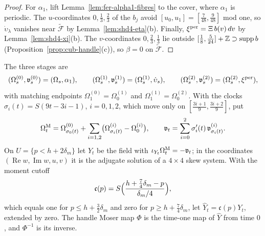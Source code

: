\begin{proof}
For $\alpha_1$, lift Lemma~\ref{lem:fer-alpha1-fibres} to the cover, where $\alpha_1$ is periodic. The $u$-coordinates $0,\frac13,\frac23$ of the $b_j$ avoid $[u_0,u_1]=[\frac7{48},\frac9{48}]$ mod one, so $\dot\upsilon_\lambda$ vanishes near $\widetilde{\mathcal F}$ by Lemma~\ref{lem:shd4-eta}(b). Finally, $\xi^{\rm per}=\Xi\,b(v)\,dv$ by Lemma~\ref{lem:shd4-xi}(b). The $v$-coordinates $0,\frac23,\frac13$ lie outside $[\frac18,\frac5{24}]+\mathbb{Z}\supset\operatorname{supp}b$ (Proposition~\ref{prop:cub-handle}(c)), so $\beta=0$ on $\widetilde{\mathcal F}$.
\end{proof}

\begin{construction}\label{cons:shd4-moser}
The three stages are
\[
 (\Omega^{(0)}_s,\mathfrak v^{(0)}_s)=(\Omega_s,\alpha_1),\qquad
 (\Omega^{(1)}_s,\mathfrak v^{(1)}_s)=(\Omega^{(1)}_s,\dot\upsilon_s),\qquad
 (\Omega^{(2)}_s,\mathfrak v^{(2)}_s)=(\Omega^{(2)}_s,\xi^{\rm per}),
\]
with matching endpoints $\Omega^{(0)}_1=\Omega^{(1)}_0$ and $\Omega^{(1)}_1=\Omega^{(2)}_0$. With the clocks $\sigma_i(t)=S(9t-3i-1)$,
$i=0,1,2$, which move only on $[\frac{3i+1}9,\frac{3i+2}9]$, put
\[
 \Omega^{\rm M}_t=\Omega^{(0)}_{\sigma_0(t)}+\sum_{i=1,2}\bigl(\Omega^{(i)}_{\sigma_i(t)}-\Omega^{(i)}_0\bigr),\qquad
 \mathfrak v_t=\sum_{i=0}^2\sigma_i'(t)\,\mathfrak v^{(i)}_{\sigma_i(t)} .
\]
On $U=\{p<h+2\delta_m\}$ let $Y_t$ be the field with $\iota_{Y_t}\Omega^{\rm M}_t=-\mathfrak v_t$; in the coordinates
$(\operatorname{Re}w,\operatorname{Im}w,u,v)$ it is the adjugate solution of a $4\times4$ skew system. With the moment cutoff
\[
 \mathfrak c(p)=S\Bigl(\frac{h+\frac74\delta_m-p}{\delta_m/4}\Bigr),
\]
which equals one for $p\le h+\frac32\delta_m$ and zero for $p\ge h+\frac74\delta_m$, let $\widehat Y_t=\mathfrak c(p)Y_t$, extended by zero.
The handle Moser map $\Phi$ is the time-one map of $\widehat Y$ from time $0$, and $\Phi^{-1}$ is its inverse.
\end{construction}


